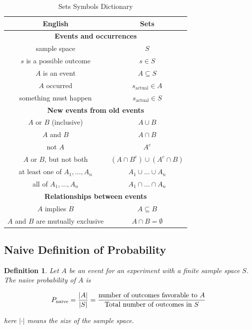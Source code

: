 \documentclass[a4paper,10pt]{article}
\newtheorem{definition}{Definition}[section] %
\begin{document}
\begin{table}[htbp]
    \centering
    \begin{tabular}{|c|c|}
    \hline
    \textbf{English} & \textbf{Sets} \\
    \hline
    \multicolumn{2}{|c|}{\textbf{Events and occurrences}} \\
    \hline
    sample space & $S$ \\
    \hline
    $s$ is a possible outcome & $s \in S$ \\
    \hline
    $A$ is an event & $A \subseteq S$ \\
    \hline
    $A$ occurred & $s_{\text{actual}} \in A$ \\
    \hline
    something must happen & $s_{\text{actual}} \in S$ \\
    \hline
    \multicolumn{2}{|c|}{\textbf{New events from old events}} \\
    \hline
    $A$ or $B$ (inclusive) & $A \cup B$ \\
    \hline
    $A$ and $B$ & $A \cap B$ \\
    \hline
    not $A$ & $A^c$ \\
    \hline
    $A$ or $B$, but not both & $(A \cap B^c) \cup (A^c \cap B)$ \\
    \hline
    at least one of $A_1, \ldots, A_n$ & $A_1 \cup \ldots \cup A_n$ \\
    \hline
    all of $A_1, \ldots, A_n$ & $A_1 \cap \ldots \cap A_n$ \\
    \hline
    \multicolumn{2}{|c|}{\textbf{Relationships between events}} \\
    \hline
    $A$ implies $B$ & $A \subseteq B$ \\
    \hline
    $A$ and $B$ are mutually exclusive & $A \cap B = \emptyset$ \\
    \hline
    \end{tabular}
    \caption{Sets Symbols Dictionary}
    \label{tab:notation}
\end{table}

\subsection{Naive Definition of Probability}

\begin{definition}
    Let $A$ be an event for an experiment with a finite sample space $S$. The naive probability of $A$ is

    \begin{equation}
    P_{\text{naive}} = \frac{|A|}{|S|} = \frac{\textnormal{number of outcomes favorable to } A}{\textnormal{Total number of outcomes in } S}
    \end{equation}

    here $|\cdot|$ means the size of the sample space.
\end{definition}
\end{document}
